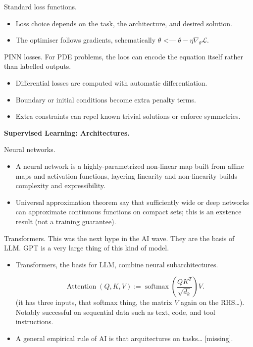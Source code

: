 \medskip\noindent
Standard loss functions.
\begin{itemize}
\item Loss choice depends on the task,
the architecture, and desired solution.
\item The optimiser follows gradients,
schematically $\theta$ <--- $\theta-
\eta \nabla_{\theta}\mathcal{L} $.
\end{itemize}

\medskip\noindent
PINN losses.
For PDE problems, the loos can encode the
equation
itself rather than labelled outputs.
\begin{itemize}
\item Differential losses are computed with
automatic differentiation.
\item Boundary or initial conditions become
extra penalty terms.
\item Extra constraints can repel known
trivial solutions or enforce
symmetries.
\end{itemize}

\medskip\noindent
{\bf Supervised Learning: Architectures.}

\medskip\noindent
Neural networks.
\begin{itemize}
\item A neural network is a highly-parametrized
non-linear map built from affine maps and
activation functions, layering linearity and
non-linearity builds complexity and
expressibility.

\item Universal approximation theorem say that
sufficiently wide or deep networks can
approximate continuous functions on compact
sets;
this is an exstence result (not a training
guarantee).
\end{itemize}

\medskip\noindent
Transformers.
This was the next hype in the AI wave.
They are the basis of LLM. GPT is a very
large thing of this kind of model.
\begin{itemize}
\item Transformers, the basis for LLM,
combine neural subarchitectures.

$$
\operatorname{Attention}(Q,K,V)
:=\operatorname{softmax}
\left(\frac{Q K^T}{\sqrt{d_k}}\right)V.
$$
(it has three inputs, that softmax thing,
the matrix $V$ again on the RHS…).
Notably successful on sequential data such
as text, code, and tool instructions.

\item A general empirical rule of AI is that
arquitectures on tasks… [missing].
\end{itemize}

